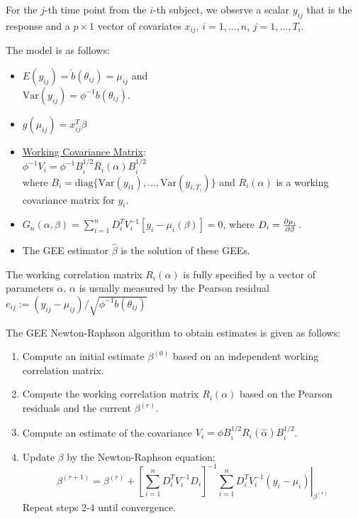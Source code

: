 \documentclass[12pt]{article}
\newcommand{\Var}{\mathrm{Var}}
\newcommand{\sumn}{\sum_{i=1}^n}
\newcommand{\bhat}{\hat{\beta}}
\newcommand{\diag}{\text{diag}}
\numberwithin{equation}{section}
\begin{document}
For the $j$-th time point from the $i$-th subject, we observe a scalar $y_{ij}$ that is the response and a $p \times 1$ vector of covariates $x_{ij}$, $i = 1, \ldots, n$, $j = 1, \ldots, T_i$. 

The model is as follows:
\begin{itemize}
  \item $E(y_{ij}) = \dot{b}(\theta_{ij}) = \mu_{ij}$ and \\ $\Var(y_{ij}) = \phi^{-1} \ddot{b}(\theta_{ij})$.
  \item $g(\mu_{ij}) = x_{ij}^T \beta$
  \item \underline{Working Covariance Matrix}: \\
  $\phi^{-1} V_i = \phi^{-1} B_i^{1/2} R_i(\alpha) B_i^{1/2}$ \\
  where $B_i = \diag\{ \Var(y_{i1}), \ldots, \Var(y_{i, T_i}) \}$ and $R_i(\alpha)$ is a working covariance matrix for $y_i$.
  \item 
  $G_n(\alpha, \beta) = \sumn D_i^T V_i^{-1} [y_i - \mu_i(\beta)] = 0$, where $D_i = \pdv{\mu_i}{\beta}$.
  \item The GEE estimator $\bhat$ is the solution of these GEEs.
\end{itemize}

The working correlation matrix $R_i(\alpha)$ is fully specified by a vector of parameters $\alpha$. $\alpha$ is usually measured by the Pearson residual $e_{ij} := (y_{ij} - \mu_{ij}) / \sqrt{\phi^{-1} \ddot{b}(\theta_{ij})}$

The GEE Newton-Raphson algorithm to obtain estimates is given as follows:
\begin{enumerate}
  \item Compute an initial estimate $\beta^{(0)}$ based on an independent working correlation matrix.
  \item Compute the working correlation matrix $R_i(\alpha)$ based on the Pearson residuals and the current $\beta^{(r)}$. 
  \item Compute an estimate of the covariance $V_i = \phi B_i^{1/2} R_i(\hat{\alpha}) B_i^{1/2}$.
  \item Update $\beta$ by the Newton-Raphson equation:
  \begin{equation*}
    \beta^{(r + 1)} = \beta^{(r)} + 
      \left[
        \sumn D_i^T V_i^{-1} D_i
      \right] ^{-1}
      \left. \sumn D_i^T V_i^{-1} (y_i - \mu_i) \right\rvert_{\beta^(r)}
  \end{equation*}
  Repeat steps 2-4 until convergence.
\end{enumerate}
\end{document}

